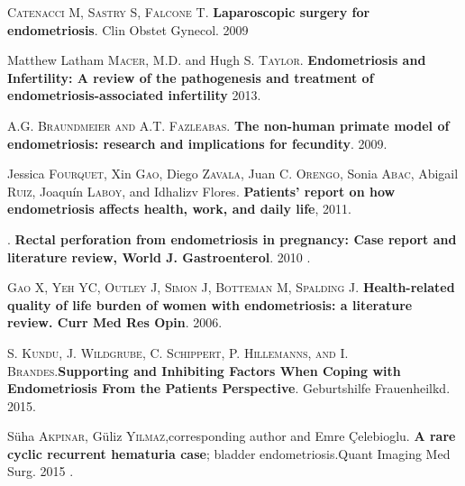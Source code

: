 \documentclass[12pt]{article} %
\begin{document}
\textsc{Catenacci M, Sastry S, Falcone T}.\textbf{ Laparoscopic surgery for endometriosis}. Clin Obstet Gynecol. 2009

\vspace{0,5cm}

Matthew Latham\textsc{ Macer}, M.D. and Hugh S.\textsc{ Taylor}. \textbf{Endometriosis and Infertility: A review of the pathogenesis and treatment of endometriosis-associated infertility} 2013.

\vspace{0,5cm}

\textsc{A.G. Braundmeier and A.T. Fazleabas}. \textbf{The non-human primate model of endometriosis: research and implications for fecundity}. 2009.

\vspace{0,5cm}

Jessica\textsc{ Fourquet}, Xin\textsc{ Gao}, Diego\textsc{ Zavala}, Juan C. \textsc{Orengo}, Sonia\textsc{ Abac}, Abigail\textsc{ Ruiz}, Joaquín\textsc{ Laboy}, and Idhalizv{ Flores}.\textbf{ Patients’ report on how endometriosis affects health, work, and daily life}, 2011.

\vspace{0,5cm}

. \textbf{Rectal perforation from endometriosis in pregnancy: Case report and literature review, World J. Gastroenterol}. 2010 .

\vspace{0,5cm}

\textsc{Gao X, Yeh YC, Outley J, Simon J, Botteman M, Spalding J}. \textbf{Health-related quality of life burden of women with endometriosis: a literature review. Curr Med Res Opin}. 2006.

\vspace{0,5cm}

\textsc{S. Kundu, J. Wildgrube, C. Schippert, P. Hillemanns, and I. Brandes}.\textbf{Supporting and Inhibiting Factors When Coping with Endometriosis From the Patients Perspective}. Geburtshilfe Frauenheilkd. 2015.

\vspace{0,5cm}

Süha\textsc{ Akpınar}, Güliz \textsc{Yılmaz},corresponding author and Emre Çelebioglu.\textbf{ A rare cyclic recurrent hematuria case}; bladder endometriosis.Quant Imaging Med Surg. 2015 .

\vspace{0,5cm}
\end{document}
